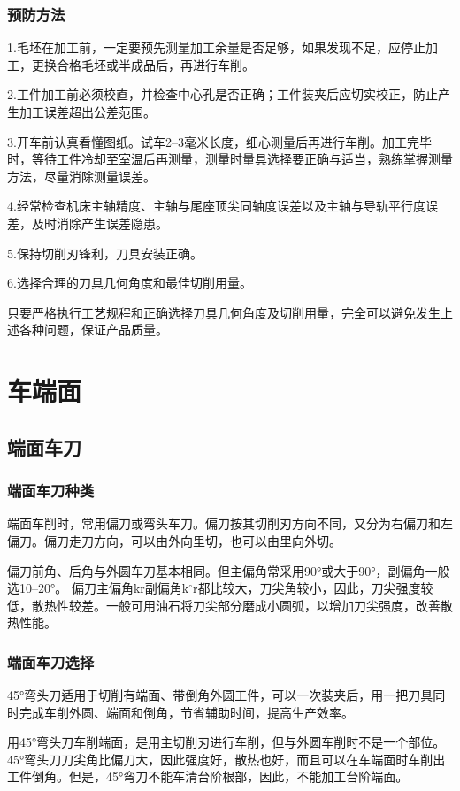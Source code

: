 \documentclass{ctexbook}
\begin{document}
\subsubsection{预防方法}
1.毛坯在加工前，一定要预先测量加工余量是否足够，如果发现不足，应停止加工，更换合格毛坯或半成品后，再进行车削。

2.工件加工前必须校直，并检查中心孔是否正确；工件装夹后应切实校正，防止产生加工误差超出公差范围。

3.开车前认真看懂图纸。试车2--3毫米长度，细心测量后再进行车削。加工完毕时，等待工件冷却至室温后再测量，测量时量具选择要正确与适当，熟练掌握测量方法，尽量消除测量误差。

4.经常检查机床主轴精度、主轴与尾座顶尖同轴度误差以及主轴与导轨平行度误差，及时消除产生误差隐患。

5.保持切削刃锋利，刀具安装正确。

6.选择合理的刀具几何角度和最佳切削用量。

只要严格执行工艺规程和正确选择刀具几何角度及切削用量，完全可以避免发生上述各种问题，保证产品质量。
\section{车端面}
\subsection{端面车刀}
\subsubsection{端面车刀种类}
端面车削时，常用偏刀或弯头车刀。偏刀按其切削刃方向不同，又分为右偏刀和左偏刀。偏刀走刀方向，可以由外向里切，也可以由里向外切。

偏刀前角、后角与外圆车刀基本相同。但主偏角常采用90°或大于90°，副偏角一般选10--20°。
偏刀主偏角kr副偏角k$^{\circ}$r都比较大，刀尖角较小，因此，刀尖强度较低，散热性较差。一般可用油石将刀尖部分磨成小圆弧，以增加刀尖强度，改善散热性能。
\subsubsection{端面车刀选择}
45°弯头刀适用于切削有端面、带倒角外圆工件，可以一次装夹后，用一把刀具同时完成车削外圆、端面和倒角，节省辅助时间，提高生产效率。

用45°弯头刀车削端面，是用主切削刃进行车削，但与外圆车削时不是一个部位。45°弯头刀刀尖角比偏刀大，因此强度好，散热也好，而且可以在车端面时车削出工件倒角。但是，45°弯刀不能车清台阶根部，因此，不能加工台阶端面。
\end{document}
